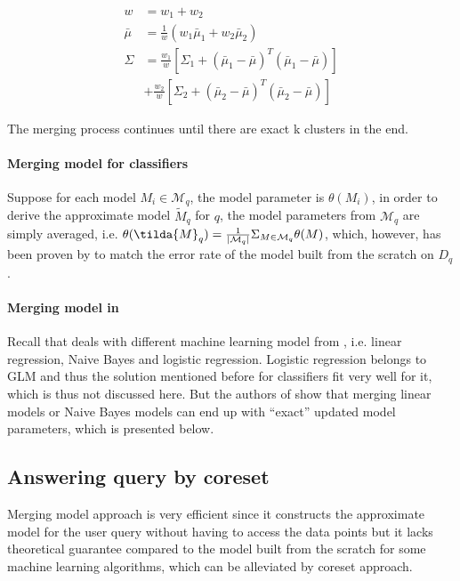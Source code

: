 \begin{equation}\label{eq: GMM_merging}
    \begin{split}
        w &= w_1 + w_2\\
        \bar{\mu} &= \frac{1}{w}(w_1\bar{\mu}_1 + w_2\bar{\mu}_2)\\
        \Sigma &= \frac{w_1}{w}[\Sigma_1 + (\bar{\mu}_1 - \bar{\mu})^T(\bar{\mu}_1 -\bar{\mu})]\\
        &+\frac{w_2}{w}[\Sigma_2 + (\bar{\mu}_2 - \bar{\mu})^T(\bar{\mu}_2 -\bar{\mu})]
    \end{split}
\end{equation}

The merging process continues until there are exact k clusters in the end.


\paragraph{Merging model for classifiers}
Suppose for each model $M_i \in \mathcal{M}_q$, the model parameter is $\theta(M_i)$, in order to derive the approximate model $\tilde{M}_q$ for $q$, the model parameters from $\mathcal{M}_q$ are simply averaged, i.e. $\theta(\tilda{M}_q) = \frac{1}{|\mathcal{M}_q|}\Sigma_{M \in \mathcal{M}_q}\theta(M)$, which, however, has been proven by \cite{zhang2012communication} to match the error rate of the model built from the scratch on $D_q$.

\paragraph{Merging model in \cite{gupta2015processing}} Recall that \cite{gupta1993maintaining} deals with different machine learning model from \cite{hasani2018efficient}, i.e. linear regression, Naive Bayes and logistic regression. Logistic regression belongs to GLM and thus the solution mentioned before for classifiers fit very well for it, which is thus not discussed here. But the authors of \cite{hasani2018efficient} show that merging linear models or Naive Bayes models can end up with ``exact'' updated model parameters, which is presented below.



\subsection{Answering query by coreset}
Merging model approach is very efficient since it constructs the approximate model for the user query without having to access the data points but it lacks theoretical guarantee compared to the model built from the scratch for some machine learning algorithms, which can be alleviated by coreset approach.


